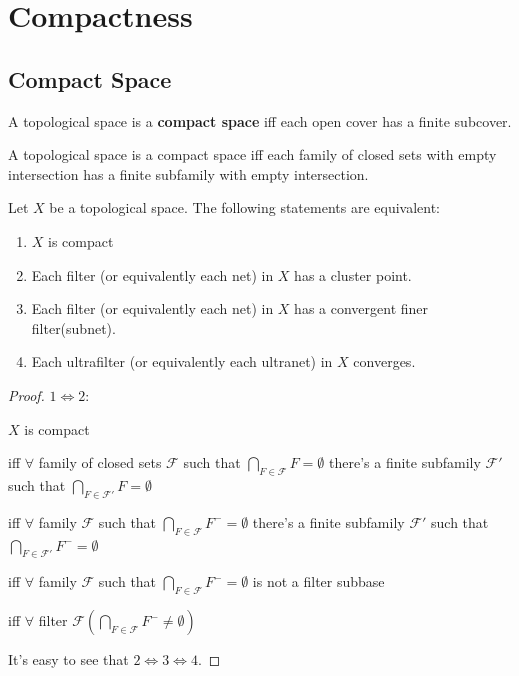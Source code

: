 \documentclass[12pt]{book}
\begin{document}
\chapter{Compactness}
\section{Compact Space}

\begin{definition}
	A topological space is a {\bf compact space} iff each open cover has a finite subcover. 
\end{definition}

\begin{lemma}
	A topological space is a compact space iff each family of closed sets with empty intersection has a finite subfamily with empty intersection. 
\end{lemma}

\begin{theorem}
	Let $X$ be a topological space. The following statements are equivalent:
	\begin{enumerate}
		\item $X$ is compact
		\item Each filter (or equivalently each net) in $X$ has a cluster point.
		\item Each filter (or equivalently each net) in $X$ has a convergent finer filter(subnet).
		\item Each ultrafilter (or equivalently each ultranet) in $X$ converges.
	\end{enumerate}
	\label{thm:compact_cluster}
\end{theorem}
\begin{proof}

	$1\Leftrightarrow2$:
	
	$X$ is compact
	
	iff $\forall$ family of closed sets $\mathcal F$ such that $\bigcap_{F\in\mathcal F}F=\emptyset$ there's a finite subfamily $\mathcal F'$ such that $\bigcap_{F\in\mathcal F'}F=\emptyset$
	
	iff $\forall$ family $\mathcal F$ such that $\bigcap_{F\in\mathcal F}F^-=\emptyset$ there's a finite subfamily $\mathcal F'$ such that $\bigcap_{F\in\mathcal F'}F^-=\emptyset$
	
	iff $\forall$ family $\mathcal F$ such that $\bigcap_{F\in\mathcal F}F^-=\emptyset$ is not a filter subbase
	
	iff $\forall$ filter $\mathcal F(\bigcap_{F\in\mathcal F}F^-\neq\emptyset)$

	It's easy to see that $2\Leftrightarrow 3\Leftrightarrow 4$.
\end{proof}
\end{document}
